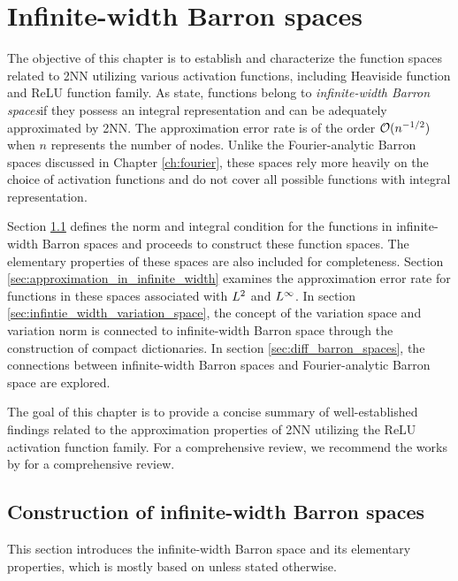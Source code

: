 \chapter{Infinite-width Barron spaces}
\label{ch:infinite}

The objective of this chapter is to establish and characterize the function
spaces related to 2NN utilizing various activation functions, including
Heaviside function and ReLU function family. As
\cite{carageaNeuralNetworkApproximation2022} state, functions belong to
\textit{infinite-width Barron spaces}if they possess an integral representation
and can be adequately approximated by 2NN. The approximation error rate is of
the order $\mathcal{O}(n^{-1/2})$ when $n$ represents the number of nodes. Unlike the
Fourier-analytic Barron spaces discussed in Chapter \ref{ch:fourier}, these
spaces rely more heavily on the choice of activation functions and do not cover
all possible functions with integral representation.

Section \ref{sec:construction_of_infinite_width} defines the norm and integral
condition for the functions in infinite-width Barron spaces and proceeds to
construct these function spaces. The elementary properties of these spaces are
also included for completeness. Section
\ref{sec:approximation_in_infinite_width} examines the approximation error rate
for functions in these spaces associated with $L^{2}$ and $L^{\infty}$. In
section \ref{sec:infintie_width_variation_space}, the concept of the variation
space and variation norm is connected to infinite-width Barron space through the
construction of compact dictionaries. In section \ref{sec:diff_barron_spaces},
the connections between infinite-width Barron spaces and Fourier-analytic Barron
space are explored.

The goal of this chapter is to provide a concise summary of well-established
findings related to the approximation properties of 2NN utilizing the ReLU
activation function family. For a comprehensive review, we recommend the works
by \cite{eMathematicalUnderstandingNeural2020, bernerModernMathematicsDeep2022}
for a comprehensive review.


\section{Construction of infinite-width Barron spaces}
\label{sec:construction_of_infinite_width}

This section introduces the infinite-width Barron space and its elementary
properties, which is mostly based on \cite{eBarronSpaceFlowinduced2021} unless
stated otherwise.

